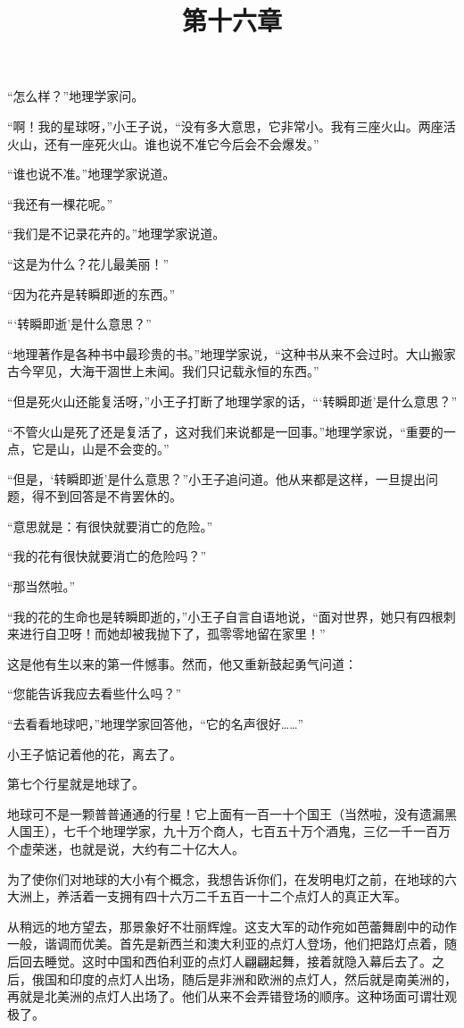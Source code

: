 “怎么样？”地理学家问。

“啊！我的星球呀，”小王子说，“没有多大意思，它非常小。我有三座火山。两座活火山，还有一座死火山。谁也说不准它今后会不会爆发。”

“谁也说不准。”地理学家说道。

“我还有一棵花呢。”

“我们是不记录花卉的。”地理学家说道。

“这是为什么？花儿最美丽！”

“因为花卉是转瞬即逝的东西。”

“‘转瞬即逝'是什么意思？”

“地理著作是各种书中最珍贵的书。”地理学家说，“这种书从来不会过时。大山搬家古今罕见，大海干涸世上未闻。我们只记载永恒的东西。”

“但是死火山还能复活呀，”小王子打断了地理学家的话，“‘转瞬即逝'是什么意思？”

“不管火山是死了还是复活了，这对我们来说都是一回事。”地理学家说，“重要的一点，它是山，山是不会变的。”

“但是，‘转瞬即逝'是什么意思？”小王子追问道。他从来都是这样，一旦提出问题，得不到回答是不肯罢休的。

“意思就是：有很快就要消亡的危险。”

“我的花有很快就要消亡的危险吗？”

“那当然啦。”

“我的花的生命也是转瞬即逝的，”小王子自言自语地说，“面对世界，她只有四根刺来进行自卫呀！而她却被我抛下了，孤零零地留在家里！”

这是他有生以来的第一件憾事。然而，他又重新鼓起勇气问道：

“您能告诉我应去看些什么吗？”

“去看看地球吧，”地理学家回答他，“它的名声很好\ldots{}\ldots{}”

小王子惦记着他的花，离去了。

\title{第十六章}

第七个行星就是地球了。

地球可不是一颗普普通通的行星！它上面有一百一十个国王（当然啦，没有遗漏黑人国王），七千个地理学家，九十万个商人，七百五十万个酒鬼，三亿一千一百万个虚荣迷，也就是说，大约有二十亿大人。

为了使你们对地球的大小有个概念，我想告诉你们，在发明电灯之前，在地球的六大洲上，养活着一支拥有四十六万二千五百一十二个点灯人的真正大军。

从稍远的地方望去，那景象好不壮丽辉煌。这支大军的动作宛如芭蕾舞剧中的动作一般，谐调而优美。首先是新西兰和澳大利亚的点灯人登场，他们把路灯点着，随后回去睡觉。这时中国和西伯利亚的点灯人翩翩起舞，接着就隐入幕后去了。之后，俄国和印度的点灯人出场，随后是非洲和欧洲的点灯人，然后就是南美洲的，再就是北美洲的点灯人出场了。他们从来不会弄错登场的顺序。这种场面可谓壮观极了。


